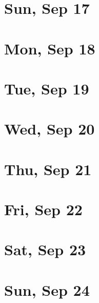 	\section{Sun, Sep 17}
		
		
	\section{Mon, Sep 18}
		
		
	\section{Tue, Sep 19}
		
		
	\section{Wed, Sep 20}
		
		
	\section{Thu, Sep 21}
		
		
	\section{Fri, Sep 22}
		
		
	\section{Sat, Sep 23}
		
		
	\section{Sun, Sep 24}
		
		
